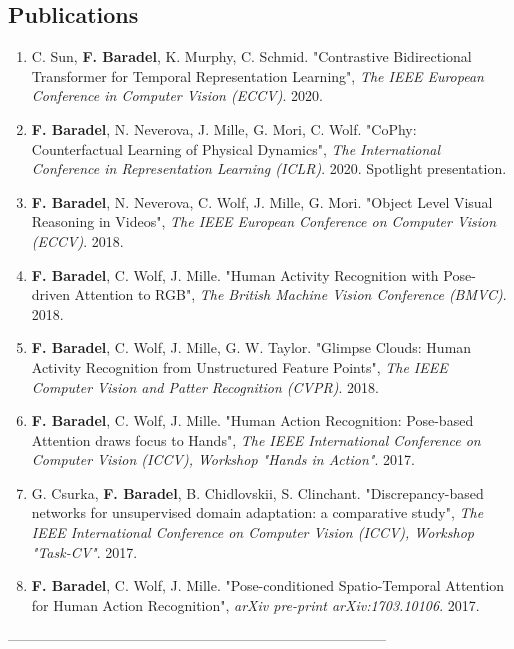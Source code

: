 \documentclass[10pt]{res} %
\begin{document}
\begin{resume}
\section{\large Publications} 
\begin{enumerate}[wide=0pt]
	\item C. Sun, \textbf{F. Baradel}, K. Murphy, C. Schmid. "Contrastive Bidirectional Transformer for Temporal Representation Learning", \textit{The IEEE European Conference in Computer Vision (ECCV)}. 2020.
	\item \textbf{F. Baradel}, N. Neverova, J. Mille, G. Mori, C. Wolf. "CoPhy: Counterfactual Learning of Physical Dynamics", \textit{The International Conference in Representation Learning (ICLR)}. 2020. Spotlight presentation.%
	\item \textbf{F. Baradel}, N. Neverova, C. Wolf, J. Mille, G. Mori. "Object Level Visual Reasoning in Videos", \textit{The IEEE European Conference on Computer Vision (ECCV)}. 2018.%
	\item \textbf{F. Baradel}, C. Wolf, J. Mille. "Human Activity Recognition with Pose-driven Attention to RGB", \textit{The British Machine Vision Conference (BMVC)}. 2018.%
	\item \textbf{F. Baradel}, C. Wolf, J. Mille, G. W. Taylor. "Glimpse Clouds: Human Activity Recognition from Unstructured Feature Points", \textit{The IEEE Computer Vision and Patter Recognition (CVPR)}. 2018.%
	\item \textbf{F. Baradel}, C. Wolf, J. Mille. "Human Action Recognition: Pose-based Attention draws focus to Hands", \textit{The IEEE International Conference on Computer Vision (ICCV), Workshop "Hands in Action"}. 2017.%
	\item G. Csurka, \textbf{F. Baradel}, B. Chidlovskii, S. Clinchant. "Discrepancy-based networks for unsupervised domain adaptation: a comparative study",  \textit{The IEEE International Conference on Computer Vision (ICCV), Workshop "Task-CV"}. 2017.%
	\item \textbf{F. Baradel}, C. Wolf, J. Mille. "Pose-conditioned Spatio-Temporal Attention for Human Action Recognition",  \textit{arXiv pre-print arXiv:1703.10106}. 2017.%
\end{enumerate}
---------------------------------------------------------------------------------



\end{resume}
\end{document}
